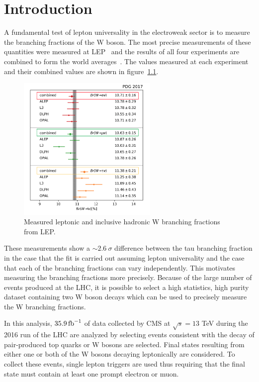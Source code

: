 \chapter{Introduction}
\label{sec:introduction}


A fundamental test of lepton universality in the electroweak sector is to measure the branching fractions of the W boson.  The most precise measurements of these quantities were measured at LEP~\cite{Schael:2013ita} and the results of all four experiments are combined to form the world averages~\cite{Patrignani:2016xqp}.  The values measured at each experiment and their combined values are shown in figure~\ref{fig:introduction:wbr}.

\begin{figure}[ht]
    \centering
    \includegraphics[width=0.6\textwidth]{chapters/Introduction/figures/wdecay.png}
    \caption{Measured leptonic and inclusive hadronic W branching fractions from LEP.}
    \label{fig:introduction:wbr}
\end{figure}


These measurements show a $\sim 2.6~\sigma$ difference between the tau branching fraction in the case that the fit is carried out assuming lepton universality and the case that each of the branching fractions can vary independently.  This motivates measuring the branching fractions more precisely.  Because of the large number of \ttbar events produced at the LHC, it is possible to select a high statistics, high purity dataset containing two W boson decays which can be used to precisely measure the W branching fractions.  


In this analysis, $35.9\mbox{\ensuremath{\,\text{fb}^{-1}}}$ of data collected by CMS at $\sqrt{s} =13$ TeV during the 2016 run of the LHC are analyzed by selecting events consistent with the decay of pair-produced top quarks or W bosons are selected.  Final states resulting from either one or both of the W bosons decaying leptonically are considered.  To collect these events, single lepton triggers are used thus requiring that the final state must contain at least one prompt electron or muon. 

